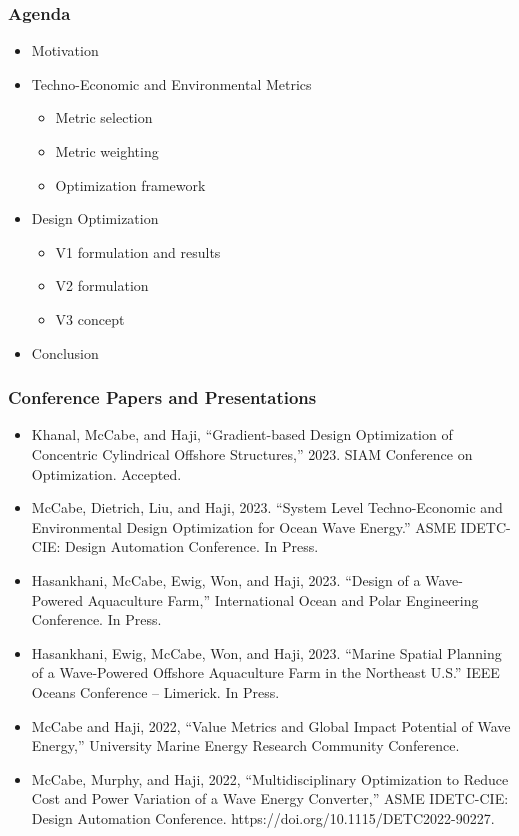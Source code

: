 \begin{frame}
	\frametitle{Agenda}
	\begin{itemize}
		\item Motivation
		\item Techno-Economic and Environmental Metrics
		      \begin{itemize}
		      	\item Metric selection
		      	\item Metric weighting
		      	\item Optimization framework
		      \end{itemize}
		\item Design Optimization
		      \begin{itemize}
		      	\item V1 formulation and results
		      	\item V2 formulation
		      	\item V3 concept
		      \end{itemize}
		\item Conclusion
	\end{itemize}
\end{frame}


\begin{frame}
	\frametitle{Conference Papers and Presentations}
	\begin{itemize}
		\item Khanal, McCabe, and Haji, “Gradient-based Design Optimization of Concentric Cylindrical Offshore Structures,” 2023. SIAM Conference on Optimization. Accepted.
		\item McCabe, Dietrich, Liu, and Haji, 2023. “System Level Techno-Economic and Environmental Design Optimization for Ocean Wave Energy.” ASME IDETC-CIE: Design Automation Conference. In Press.
		\item Hasankhani, McCabe, Ewig, Won, and Haji, 2023. “Design of a Wave-Powered Aquaculture Farm,” International Ocean and Polar Engineering Conference. In Press.
		\item Hasankhani, Ewig, McCabe, Won, and Haji, 2023. “Marine Spatial Planning of a Wave-Powered Offshore Aquaculture Farm in the Northeast U.S.” IEEE Oceans Conference – Limerick. In Press.
		\item McCabe and Haji, 2022, “Value Metrics and Global Impact Potential of Wave Energy,” University Marine Energy Research Community Conference.
		\item McCabe, Murphy, and Haji, 2022, “Multidisciplinary Optimization to Reduce Cost and Power Variation of a Wave Energy Converter,” ASME IDETC-CIE: Design Automation Conference. https://doi.org/10.1115/DETC2022-90227.
	\end{itemize}
\end{frame}


